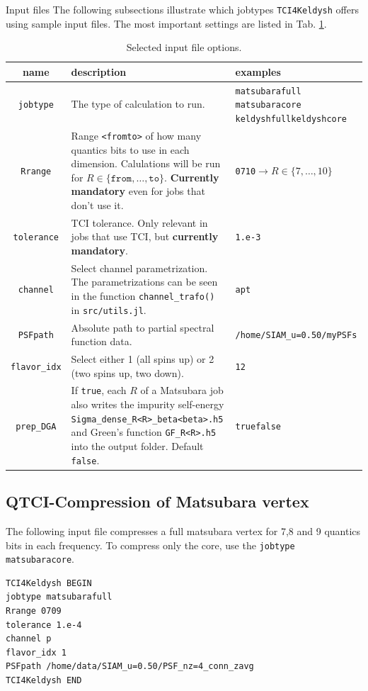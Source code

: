 \documentclass[12pt]{article}
\begin{document}
\begin{section}{Input files}
The following subsections illustrate which jobtypes \texttt{TCI4Keldysh} offers using sample input files.
The most important settings are listed in Tab. \ref{tab:options}.
\begin{table}[h]
    \centering
    \begin{tabular}{c|p{6cm}|p{5cm}}
        \toprule
        name & description & examples\\
        \midrule
            \texttt{jobtype} & The type of calculation to run. & \texttt{matsubarafull} \texttt{matsubaracore} \texttt{keldyshfull}\vfil \texttt{keldyshcore}\\
        \midrule
        \texttt{Rrange} &
        Range \texttt{<fromto>} of how many quantics bits to use in each dimension.
        Calulations will be run for $R\in\{\texttt{from},\ldots,\texttt{to}\}$.
        \textbf{Currently mandatory} even for jobs that don't use it. & \texttt{0710}$\rightarrow R\in\{7,\ldots,10\}$ \\
        \midrule
        \texttt{tolerance} & TCI tolerance. Only relevant in jobs that use TCI, but \textbf{currently mandatory}. & \texttt{1.e-3}\\
        \midrule
        \texttt{channel} & Select channel parametrization. The parametrizations can be seen in the function \texttt{channel\_trafo()} in \texttt{src/utils.jl}. & \texttt{a}\vfil \texttt{p}\vfil \texttt{t}\\
        \midrule
        \texttt{PSFpath} & Absolute path to partial spectral function data. & \texttt{/home/SIAM\_u=0.50/myPSFs}\\
        \midrule
        \texttt{flavor\_idx} & Select either 1 (all spins up) or 2 (two spins up, two down). & \texttt{1}\vfil \texttt{2}\\
        \midrule
        \texttt{prep\_DGA} &
        If \texttt{true}, each $R$ of a Matsubara job
        also writes the impurity self-energy
        \texttt{Sigma\_dense\_R<R>\_beta<beta>.h5}
        and Green's function \texttt{GF\_R<R>.h5}
        into the output folder. Default \texttt{false}. &
        \texttt{true}\vfil \texttt{false}\\
        \bottomrule
    \end{tabular}
    \caption{Selected input file options.}
    \label{tab:options}
\end{table}
\subsection{QTCI-Compression of Matsubara vertex}
The following input file compresses a full matsubara vertex for 7,8 and 9 quantics bits in each frequency.
To compress only the core, use the \texttt{jobtype} \texttt{matsubaracore}.
\begin{verbatim}
TCI4Keldysh BEGIN
jobtype matsubarafull
Rrange 0709
tolerance 1.e-4
channel p
flavor_idx 1
PSFpath /home/data/SIAM_u=0.50/PSF_nz=4_conn_zavg
TCI4Keldysh END 
\end{verbatim}

\end{section}
\end{document}
